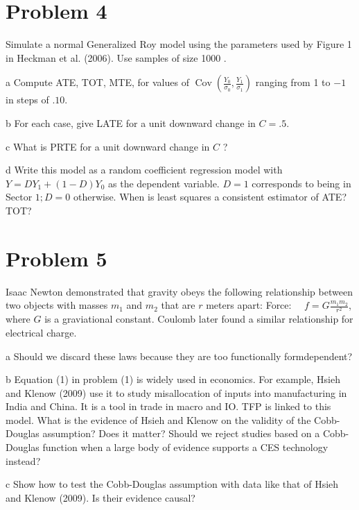 \documentclass{article}
\begin{document}
\section*{Problem 4}
Simulate a normal Generalized Roy model using the parameters used by Figure 1 in Heckman et al. (2006). Use samples of size 1000 .
\begin{problem}{a}
Compute ATE, TOT, MTE, for values of $\operatorname{Cov}\left(\frac{Y_{0}}{\sigma_{0}}, \frac{Y_{1}}{\sigma_{1}}\right)$ ranging from 1 to $-1$ in steps of $.10$.
\end{problem}
\begin{solution}

\end{solution}
\begin{problem}{b}
For each case, give LATE for a unit downward change in $C=.5$.
\end{problem}
\begin{problem}{c}
What is PRTE for a unit downward change in $C$ ?
\end{problem}
\begin{problem}{d}
Write this model as a random coefficient regression model with $Y=D Y_{1}+(1-D) Y_{0}$ as the dependent variable. $D=1$ corresponds to being in Sector $1 ; D=0$ otherwise. When is least squares a consistent estimator of ATE? TOT?
\end{problem}


\newpage
\section*{Problem 5}
Isaac Newton demonstrated that gravity obeys the following relationship between two objects with masses $m_{1}$ and $m_{2}$ that are $r$ meters apart:
Force: $\quad f=G \frac{m_{1} m_{2}}{r^{2}}$,
where $G$ is a graviational constant. Coulomb later found a similar relationship for electrical charge.
\begin{problem}{a}
Should we discard these laws because they are too functionally formdependent?
\end{problem}
\begin{problem}{b}
 Equation (1) in problem (1) is widely used in economics. For example, Hsieh and Klenow (2009) use it to study misallocation of inputs into manufacturing in India and China. It is a tool in trade in macro and IO. TFP is linked to this model. What is the evidence of Hsieh and Klenow on the validity of the Cobb-Douglas assumption? Does it matter? Should we reject studies based on a Cobb-Douglas function when a large body of evidence supports a CES technology instead?
\end{problem}
\begin{problem}{c}
Show how to test the Cobb-Douglas assumption with data like that
of Hsieh and Klenow (2009). Is their evidence causal?
\end{problem}
\end{document}
